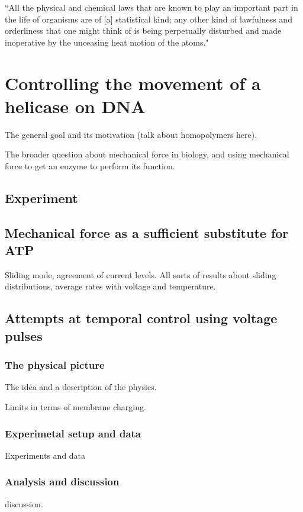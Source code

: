 \begin{savequote}[75mm]
``All the physical and chemical laws that are known to play an important part in the life of organisms are of [a] statistical kind; any other kind of lawfulness and orderliness that one might think of is being perpetually disturbed and made inoperative by the unceasing heat motion of the atoms."
\end{savequote}

\chapter{Controlling the movement of a helicase on DNA}
\label{helicase_motion_control}

The general goal and its motivation (talk about homopolymers here).

The broader question about mechanical force in biology, and using mechanical force to get an enzyme to perform its function.

\section{Experiment}

\section{Mechanical force as a sufficient substitute for ATP}

Sliding mode, agreement of current levels.  All sorts of results about sliding distributions, average rates with voltage and temperature.

\section{Attempts at temporal control using voltage pulses}

\subsection{The physical picture}
The idea and a description of the physics.

Limits in terms of membrane charging.

\subsection{Experimetal setup and data}

Experiments and data

\subsection{Analysis and discussion}

discussion.